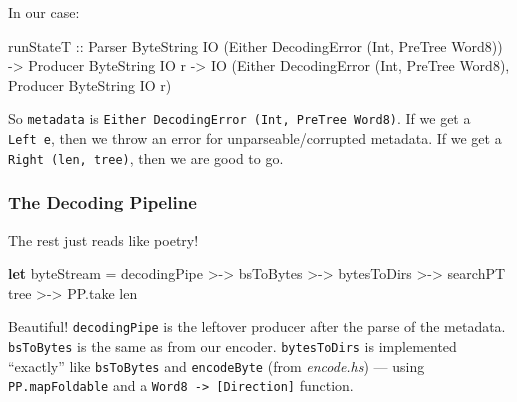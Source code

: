 \documentclass[]{article}
\newenvironment{Shaded}{}{}
\newcommand{\KeywordTok}[1]{\textcolor[rgb]{0.00,0.44,0.13}{\textbf{{#1}}}}
\newcommand{\DataTypeTok}[1]{\textcolor[rgb]{0.56,0.13,0.00}{{#1}}}
\newcommand{\OtherTok}[1]{\textcolor[rgb]{0.00,0.44,0.13}{{#1}}}
\newcommand{\FunctionTok}[1]{\textcolor[rgb]{0.02,0.16,0.49}{{#1}}}
\newcommand{\NormalTok}[1]{{#1}}
\begin{document}
In our case:

\begin{Shaded}
\begin{Highlighting}[]
\NormalTok{runStateT}
\OtherTok{  ::} \DataTypeTok{Parser}   \DataTypeTok{ByteString} \DataTypeTok{IO} \NormalTok{(}\DataTypeTok{Either} \DataTypeTok{DecodingError} \NormalTok{(}\DataTypeTok{Int}\NormalTok{, }\DataTypeTok{PreTree} \DataTypeTok{Word8}\NormalTok{))}
  \OtherTok{->} \DataTypeTok{Producer} \DataTypeTok{ByteString} \DataTypeTok{IO} \NormalTok{r}
  \OtherTok{->} \DataTypeTok{IO} \NormalTok{(}\DataTypeTok{Either} \DataTypeTok{DecodingError} \NormalTok{(}\DataTypeTok{Int}\NormalTok{, }\DataTypeTok{PreTree} \DataTypeTok{Word8}\NormalTok{), }\DataTypeTok{Producer} \DataTypeTok{ByteString} \DataTypeTok{IO} \NormalTok{r)}
\end{Highlighting}
\end{Shaded}

So \texttt{metadata} is \texttt{Either\ DecodingError\ (Int,\ PreTree\ Word8)}.
If we get a \texttt{Left\ e}, then we throw an error for unparseable/corrupted
metadata. If we get a \texttt{Right\ (len,\ tree)}, then we are good to go.

\subsubsection{The Decoding Pipeline}\label{the-decoding-pipeline}

The rest just reads like poetry!

\begin{Shaded}
\begin{Highlighting}[]
\KeywordTok{let} \NormalTok{byteStream }\FunctionTok{=} \NormalTok{decodingPipe }\FunctionTok{>->} \NormalTok{bsToBytes}
             \FunctionTok{>->} \NormalTok{bytesToDirs  }\FunctionTok{>->} \NormalTok{searchPT tree}
             \FunctionTok{>->} \NormalTok{PP.take len}
\end{Highlighting}
\end{Shaded}

Beautiful! \texttt{decodingPipe} is the leftover producer after the parse of the
metadata. \texttt{bsToBytes} is the same as from our encoder.
\texttt{bytesToDirs} is implemented ``exactly'' like \texttt{bsToBytes} and
\texttt{encodeByte} (from \emph{encode.hs}) --- using \texttt{PP.mapFoldable}
and a \texttt{Word8\ -\textgreater{}\ {[}Direction{]}} function.
\end{document}

